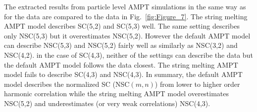 \documentclass[ALICE,manyauthors]{cernphprep}
\begin{document}
The extracted results  from particle level AMPT simulations in the same way as for the data are compared to the data in Fig.~\ref{fig:Figure_7}.
The string melting AMPT model describes SC(5,2) and SC(5,3) well. The same setting describes only NSC(5,3) but it overestimates NSC(5,2). 
However the default AMPT model can describe NSC(5,3) and NSC(5,2) fairly well as similarly as NSC(3,2) and NSC(4,2).
in the case of SC(4,3), neither of the settings can describe the data but the default AMPT model follows the data closest. 
The string melting AMPT model fails to describe SC(4,3) and NSC(4,3).
In summary, the default AMPT model describes the normalized SC (NSC$(m,n)$) from lower to higher order harmonic correlation while the string melting AMPT model overestimates NSC(5,2) and 
underestimates (or very weak correlations) NSC(4,3). 

\end{document}

